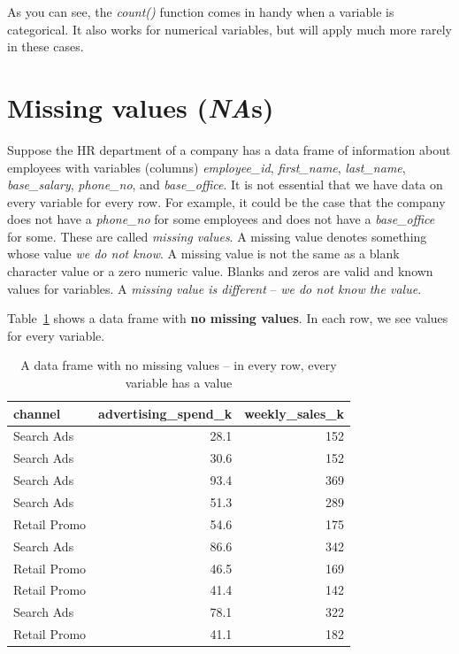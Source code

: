 \documentclass[
  12pt,
  letterpaper,
  DIV=11,
  numbers=noendperiod]{scrreprt}
\begin{document}
As you can see, the \emph{count()} function comes in handy when a
variable is categorical. It also works for numerical variables, but will
apply much more rarely in these cases.

\section{\texorpdfstring{Missing values
(\emph{NA}s)}{Missing values (NAs)}}\label{sec-missing-values}

Suppose the HR department of a company has a data frame of information
about employees with variables (columns) \emph{employee\_id},
\emph{first\_name}, \emph{last\_name}, \emph{base\_salary},
\emph{phone\_no}, and \emph{base\_office}. It is not essential that we
have data on every variable for every row. For example, it could be the
case that the company does not have a \emph{phone\_no} for some
employees and does not have a \emph{base\_office} for some. These are
called \emph{missing values}. A missing value denotes something whose
value \emph{we do not know}. A missing value is not the same as a blank
character value or a zero numeric value. Blanks and zeros are valid and
known values for variables. A \emph{missing value is different} --
\emph{we do not know the value}.

Table~\ref{tbl-no-missing-values} shows a data frame with \textbf{no
missing values}. In each row, we see values for every variable.

\begin{longtable}[]{@{}lrr@{}}

\caption{\label{tbl-no-missing-values}A data frame with no missing
values -- in every row, every variable has a value}

\tabularnewline

\toprule\noalign{}
channel & advertising\_spend\_k & weekly\_sales\_k \\
\midrule\noalign{}
\endhead
\bottomrule\noalign{}
\endlastfoot
Search Ads & 28.1 & 152 \\
Search Ads & 30.6 & 152 \\
Search Ads & 93.4 & 369 \\
Search Ads & 51.3 & 289 \\
Retail Promo & 54.6 & 175 \\
Search Ads & 86.6 & 342 \\
Retail Promo & 46.5 & 169 \\
Retail Promo & 41.4 & 142 \\
Search Ads & 78.1 & 322 \\
Retail Promo & 41.1 & 182 \\

\end{longtable}
\end{document}
